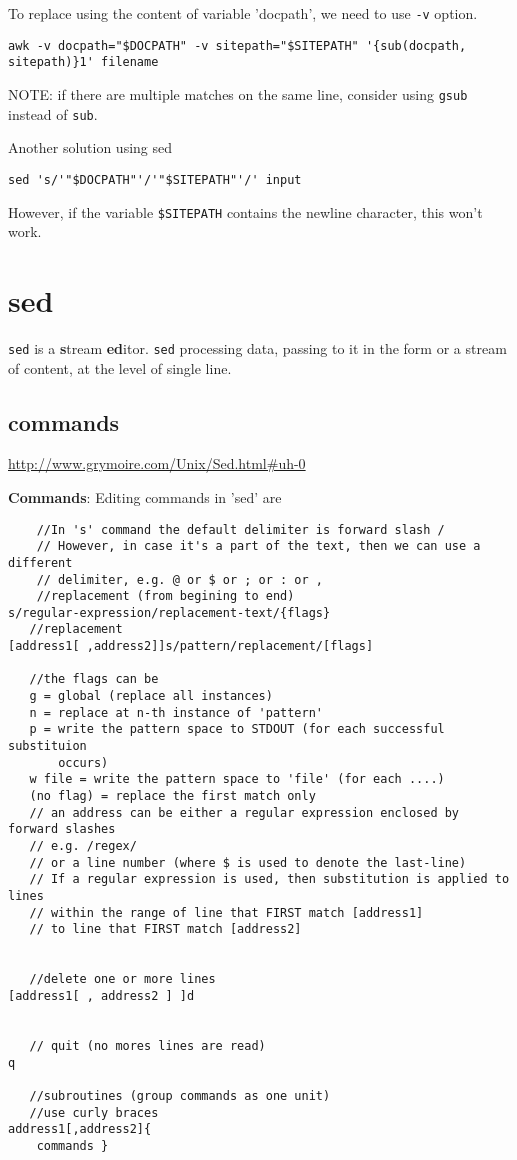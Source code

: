 To replace using the content of variable 'docpath', we need to use \verb!-v!
option.
\begin{verbatim}
awk -v docpath="$DOCPATH" -v sitepath="$SITEPATH" '{sub(docpath, sitepath)}1' filename
\end{verbatim}
NOTE: if there are multiple matches on the same line, consider using \verb!gsub!
instead of \verb!sub!.

Another solution using sed
\begin{verbatim}
sed 's/'"$DOCPATH"'/'"$SITEPATH"'/' input
\end{verbatim}
However, if the variable \verb!$SITEPATH! contains the newline character, this
won't work.

\section{sed}
\label{sec:sed}

\verb!sed! is a {\bf s}tream {\bf ed}itor.
\verb!sed! processing data, passing to it in the form or a stream of content, 
at the level of single line.

\subsection{commands}

\url{http://www.grymoire.com/Unix/Sed.html#uh-0}

{\bf Commands}: Editing commands in 'sed' are
\begin{verbatim}
    //In 's' command the default delimiter is forward slash /
    // However, in case it's a part of the text, then we can use a different
    // delimiter, e.g. @ or $ or ; or : or ,
    //replacement (from begining to end)
s/regular-expression/replacement-text/{flags}
   //replacement 
[address1[ ,address2]]s/pattern/replacement/[flags]

   //the flags can be
   g = global (replace all instances)
   n = replace at n-th instance of 'pattern'
   p = write the pattern space to STDOUT (for each successful substituion
       occurs)
   w file = write the pattern space to 'file' (for each ....)
   (no flag) = replace the first match only
   // an address can be either a regular expression enclosed by forward slashes
   // e.g. /regex/
   // or a line number (where $ is used to denote the last-line)
   // If a regular expression is used, then substitution is applied to lines
   // within the range of line that FIRST match [address1] 
   // to line that FIRST match [address2]
   
   
   //delete one or more lines
[address1[ , address2 ] ]d   


   // quit (no mores lines are read)
q   

   //subroutines (group commands as one unit)
   //use curly braces
address1[,address2]{
    commands }   
\end{verbatim}

